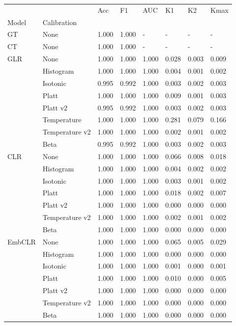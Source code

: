 \begin{tabular}{llllllll}
\toprule
 &  & Acc & F1 & AUC & K1 & K2 & Kmax \\
Model & Calibration &  &  &  &  &  &  \\
\midrule
GT & None & 1.000 & 1.000 & - & - & - & - \\
\cline{1-8}
CT & None & 1.000 & 1.000 & - & - & - & - \\
\cline{1-8}
\multirow[t]{8}{*}{GLR} & None & 1.000 & 1.000 & 1.000 & 0.028 & 0.003 & 0.009 \\
 & Histogram & 1.000 & 1.000 & 1.000 & 0.004 & 0.001 & 0.002 \\
 & Isotonic & 0.995 & 0.992 & 1.000 & 0.003 & 0.002 & 0.003 \\
 & Platt & 1.000 & 1.000 & 1.000 & 0.009 & 0.001 & 0.003 \\
 & Platt v2 & 0.995 & 0.992 & 1.000 & 0.003 & 0.002 & 0.003 \\
 & Temperature & 1.000 & 1.000 & 1.000 & 0.281 & 0.079 & 0.166 \\
 & Temperature v2 & 1.000 & 1.000 & 1.000 & 0.002 & 0.001 & 0.002 \\
 & Beta & 0.995 & 0.992 & 1.000 & 0.003 & 0.002 & 0.003 \\
\cline{1-8}
\multirow[t]{7}{*}{CLR} & None & 1.000 & 1.000 & 1.000 & 0.066 & 0.008 & 0.018 \\
 & Histogram & 1.000 & 1.000 & 1.000 & 0.004 & 0.002 & 0.002 \\
 & Isotonic & 1.000 & 1.000 & 1.000 & 0.003 & 0.001 & 0.002 \\
 & Platt & 1.000 & 1.000 & 1.000 & 0.018 & 0.002 & 0.007 \\
 & Platt v2 & 1.000 & 1.000 & 1.000 & 0.000 & 0.000 & 0.000 \\
 & Temperature v2 & 1.000 & 1.000 & 1.000 & 0.002 & 0.001 & 0.002 \\
 & Beta & 1.000 & 1.000 & 1.000 & 0.000 & 0.000 & 0.000 \\
\cline{1-8}
\multirow[t]{7}{*}{EmbCLR} & None & 1.000 & 1.000 & 1.000 & 0.065 & 0.005 & 0.029 \\
 & Histogram & 1.000 & 1.000 & 1.000 & 0.000 & 0.000 & 0.000 \\
 & Isotonic & 1.000 & 1.000 & 1.000 & 0.001 & 0.000 & 0.001 \\
 & Platt & 1.000 & 1.000 & 1.000 & 0.010 & 0.000 & 0.005 \\
 & Platt v2 & 1.000 & 1.000 & 1.000 & 0.000 & 0.000 & 0.000 \\
 & Temperature v2 & 1.000 & 1.000 & 1.000 & 0.000 & 0.000 & 0.000 \\
 & Beta & 1.000 & 1.000 & 1.000 & 0.000 & 0.000 & 0.000 \\
\cline{1-8}
\bottomrule
\end{tabular}
